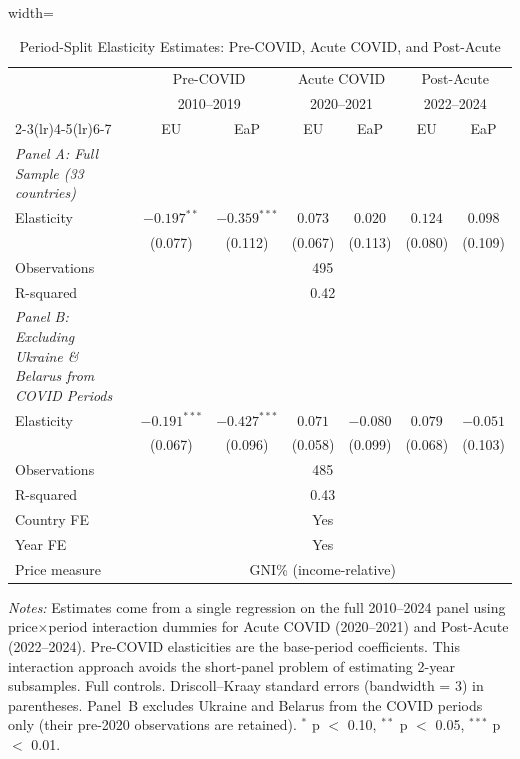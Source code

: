 \begin{table}[htbp]
\centering
\caption{Period-Split Elasticity Estimates: Pre-COVID, Acute COVID, and Post-Acute}
\label{tab:period_split}
\begin{minipage}{\textwidth}
\begin{adjustbox}{width=\textwidth}
\scriptsize
\begin{tabular}{lcccccc}
\toprule
& \multicolumn{2}{c}{Pre-COVID} & \multicolumn{2}{c}{Acute COVID} & \multicolumn{2}{c}{Post-Acute} \\
& \multicolumn{2}{c}{2010--2019} & \multicolumn{2}{c}{2020--2021} & \multicolumn{2}{c}{2022--2024} \\
\cmidrule(lr){2-3}\cmidrule(lr){4-5}\cmidrule(lr){6-7}
& EU & EaP & EU & EaP & EU & EaP \\
\midrule
\textit{Panel A: Full Sample (33 countries)} \\
Elasticity & $-0.197^{**}$ & $-0.359^{***}$ & $0.073$ & $0.020$ & $0.124$ & $0.098$ \\
& (0.077) & (0.112) & (0.067) & (0.113) & (0.080) & (0.109) \\[2pt]
Observations & \multicolumn{6}{c}{495} \\
R-squared   & \multicolumn{6}{c}{0.42} \\
\midrule
\textit{Panel B: Excluding Ukraine \& Belarus from COVID Periods} \\
Elasticity & $-0.191^{***}$ & $-0.427^{***}$ & $0.071$ & $-0.080$ & $0.079$ & $-0.051$ \\
& (0.067) & (0.096) & (0.058) & (0.099) & (0.068) & (0.103) \\[2pt]
Observations & \multicolumn{6}{c}{485} \\
R-squared   & \multicolumn{6}{c}{0.43} \\
\midrule
Country FE & \multicolumn{6}{c}{Yes} \\
Year FE    & \multicolumn{6}{c}{Yes} \\
Price measure & \multicolumn{6}{c}{GNI\% (income-relative)} \\
\bottomrule
\end{tabular}
\end{adjustbox}
\par\vspace{4pt}
\scriptsize
\textit{Notes:} Estimates come from a single regression on the full 2010--2024 panel
using price$\times$period interaction dummies for Acute COVID (2020--2021) and Post-Acute
(2022--2024). Pre-COVID elasticities are the base-period coefficients. This interaction
approach avoids the short-panel problem of estimating 2-year subsamples.
Full controls. Driscoll--Kraay standard errors (bandwidth = 3) in parentheses.
Panel~B excludes Ukraine and Belarus from the COVID periods only (their pre-2020
observations are retained). $^{*}$ p $<$ 0.10, $^{**}$ p $<$ 0.05, $^{***}$ p $<$ 0.01.
\end{minipage}
\end{table}
